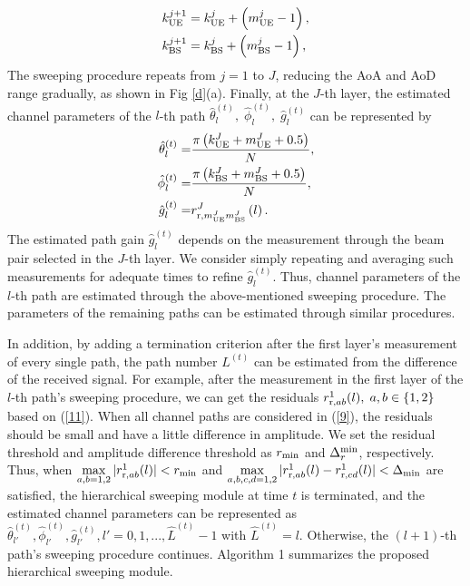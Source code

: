 \documentclass[journal,12pt,onecolumn,draftclsnofoot,]{IEEEtran}
\begin{document}
\begin{subequations}
\begin{align}
k_{{\rm{UE}}}^{j + 1} &= k_{{\rm{UE}}}^j + \left({m_{{\rm{UE}}}^j - 1} \right),\\
k_{{\rm{BS}}}^{j + 1} &= k_{{\rm{BS}}}^j + \left({m_{{\rm{BS}}}^j - 1} \right),
\end{align}
\end{subequations}
\noindent The sweeping procedure repeats from $j=1$ to $J$, reducing the AoA and AoD range gradually, as shown in Fig \ref{d}(a). 
Finally, at the $J$-th layer, the estimated channel parameters of the $l$-th path $\hat \theta _{l}^{(t )},\;\hat \phi _{l}^{(t )},\;\hat g_{l}^{(t )}$ can be represented by
\begin{subequations}\label{12}
\begin{align}
\hat \theta _{l}^{\left(t \right)} = &\frac{{\pi \left({k_{\rm UE}^J + m_{\rm UE}^J}+0.5 \right)}}{N},\\
\hat \phi _{l}^{\left(t \right)} = &\frac{{\pi \left({k_{\rm BS}^J + m_{\rm BS}^J}+0.5 \right)}}{N},\\
\hat g_{l}^{\left(t \right)} =& {{r}}_{{\rm r},m_{{\rm{UE}}}^Jm_{{\rm{BS}}}^J}^J\left( l \right).
\end{align}
\end{subequations}
The estimated path gain $\hat g_{l}^{(t )}$ depends on the measurement through the beam pair 
selected in the $J$-th layer. We consider simply repeating and averaging such measurements for adequate times to refine $\hat g_{l}^{(t )}$.
Thus, channel parameters of the $l$-th path are estimated through the above-mentioned sweeping procedure. The parameters of the remaining paths can be estimated through similar procedures.

In addition, by adding a termination criterion after the first layer's measurement of every single path, the path number ${L^{(t )}}$ can be estimated from the difference of the received signal. 
For example, after the measurement in the first layer of the $l$-th path's sweeping procedure, we can get the residuals ${{r}}_{{\rm r},ab}^1(l),\; a,b\in \{1,2\}$ based on (\ref{11}). 
When all channel paths are considered in (\ref{9}), the residuals should be small and have a little difference in amplitude.
We set the residual threshold and amplitude difference threshold as ${ r}_{\rm min}$ and ${{\rm{\Delta }}^{{\rm{min}}}_{r}}$, respectively.
Thus, when $\mathop {\max }\limits_{a,b = 1,2} | {{r}}_{{\rm r},ab}^1(l)| < {{{r }}_{{\rm{min}}}}$ and $\mathop {\max }\limits_{a,b,c,d = 1,2} | {{{r}}_{{\rm r},ab}^1(l) - {{r}}_{{\rm r},cd}^1(l)} | < {{\rm{\Delta }}_{{\rm{min}}}}$ are satisfied, the hierarchical sweeping module at time $t$ is terminated, and the estimated channel parameters can be represented as
$\hat \theta _{l'}^{(t )},\hat \phi _{l'}^{(t )},\hat g_{l'}^{(t )},l'= 0,1, ...,{\hat L}^{(t )} - 1$
with ${\hat L}^{(t )}=l$. Otherwise, the $(l+1)$-th path's sweeping procedure continues. {\color{black} Algorithm 1 summarizes the proposed hierarchical sweeping module.} 
\end{document}
